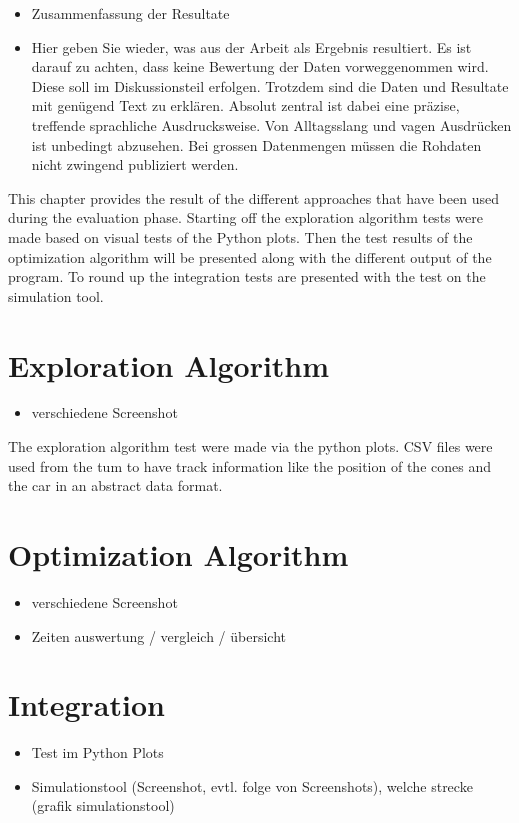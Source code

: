\begin{itemize}
    \item Zusammenfassung der Resultate
    \item Hier geben Sie wieder, was aus der Arbeit als Ergebnis resultiert. Es ist darauf zu achten, dass keine Bewertung der Daten vorweggenommen wird. Diese soll im Diskussionsteil erfolgen. Trotzdem sind die Daten und Resultate mit genügend Text zu erklären. Absolut zentral ist dabei eine präzise, treffende sprachliche Ausdrucksweise. Von Alltagsslang und vagen Ausdrücken ist unbedingt abzusehen.
    Bei grossen Datenmengen müssen die Rohdaten nicht zwingend publiziert werden.
\end{itemize}

This chapter provides the result of the different approaches that have been used during the evaluation phase. Starting off the exploration algorithm tests were made based on visual tests of the Python plots. Then the test results of the optimization algorithm will be presented along with the different output of the program. To round up the integration tests are presented with the test on the simulation tool.

\section{Exploration Algorithm}
\begin{itemize}
    \item verschiedene Screenshot
\end{itemize}
The exploration algorithm test were made via the python plots. CSV files were used from the \acrlong{tum} to have track information like the position of the cones and the car in an abstract data format. \cite{tumftm_optimization_algoritm}

\section{Optimization Algorithm}
\begin{itemize}
    \item verschiedene Screenshot
    \item Zeiten auswertung / vergleich / übersicht
\end{itemize}

\section{Integration}
\begin{itemize}
    \item Test im Python Plots
    \item Simulationstool (Screenshot, evtl. folge von Screenshots), welche strecke (grafik simulationstool)
\end{itemize}

